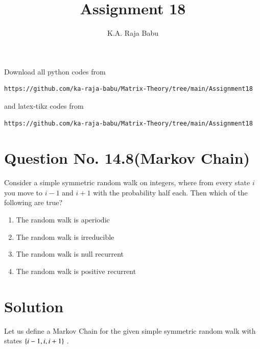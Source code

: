 \documentclass[journal,12pt,twocolumn]{IEEEtran}
\begin{document}
\makeatother
\let\StandardTheFigure\thefigure
\let\vec\mathbf
\renewcommand{\thefigure}{\theproblem}
\def\putbox#1#2#3{\makebox[0in][l]{\makebox[#1][l]{}\raisebox{\baselineskip}[0in][0in]{\raisebox{#2}[0in][0in]{#3}}}}
     \def\rightbox#1{\makebox[0in][r]{#1}}
     \def\centbox#1{\makebox[0in]{#1}}
     \def\topbox#1{\raisebox{-\baselineskip}[0in][0in]{#1}}
     \def\midbox#1{\raisebox{-0.5\baselineskip}[0in][0in]{#1}}
\vspace{3cm}
\title{Assignment 18}
\author{K.A. Raja Babu}
\maketitle
\newpage
\bigskip
\renewcommand{\thefigure}{\theenumi}
\renewcommand{\thetable}{\theenumi}
Download all python codes from 
\begin{lstlisting}
https://github.com/ka-raja-babu/Matrix-Theory/tree/main/Assignment18
\end{lstlisting}
%
and latex-tikz codes from 
%
\begin{lstlisting}
https://github.com/ka-raja-babu/Matrix-Theory/tree/main/Assignment18
\end{lstlisting}
%
\section{Question No. 14.8(Markov Chain)}

Consider a simple symmetric random walk on integers, where from every state $i$ you move to $i-1$ and $i+1$ with the probability half each. Then which of the following are true?

\begin{enumerate}
\item The random walk is aperiodic
\item The random walk is irreducible
\item The random walk is null recurrent
\item The random walk is positive recurrent
\end{enumerate}

\section{Solution}

Let us define a Markov Chain for the given simple symmetric random walk with states $\left\{i-1,i,i+1\right\}$ .
\end{document}
